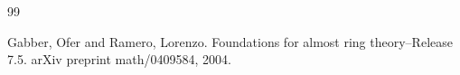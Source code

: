 \documentclass{stacks-project}
\theoremstyle{plain}
\theoremstyle{definition}
\theoremstyle{remark}
\numberwithin{equation}{subsection}
\begin{document}
\begin{thebibliography}{99}

Gabber, Ofer and Ramero, Lorenzo.
\newblock Foundations for almost ring theory--Release 7.5.
\newblock arXiv preprint math/0409584, 2004.

\end{thebibliography}
\end{document}

